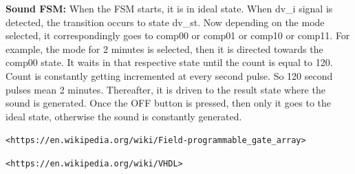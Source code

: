 \documentclass[12pt,a4paper]{article}
\begin{document}
 \textbf{Sound FSM:} When the FSM starts, it is in ideal state. When dv\_i signal is detected, the transition occurs to state dv\_st. Now depending on the mode selected, it correspondingly goes to comp00 or comp01 or comp10 or comp11. For example, the mode for 2 minutes is selected, then it is directed towards the comp00 state. It waits in that respective state until the count is equal to 120. Count is constantly getting incremented at every second pulse. So 120 second pulses mean 2 minutes. Thereafter, it is driven to the result state where the sound is generated. Once the OFF button is pressed, then only it goes to the ideal state, otherwise the sound is constantly generated. 



\newpage


\raggedright

\newpage                                                                                %
\begin{thebibliography}{}

\texttt{<https://en.wikipedia.org/wiki/Field-programmable\_gate\_array>}

\texttt{<https://en.wikipedia.org/wiki/VHDL>}



\end{thebibliography}



\clearpage
\end{document}
